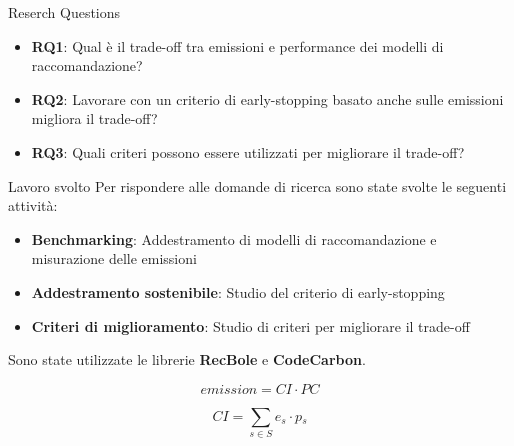 \begin{frame}{Reserch Questions}
    \begin{itemize}
        \item \textbf{RQ1}: Qual è il trade-off tra emissioni e performance dei modelli di raccomandazione?
        \item \textbf{RQ2}: Lavorare con un criterio di early-stopping basato anche sulle emissioni migliora il trade-off?
        \item \textbf{RQ3}: Quali criteri possono essere utilizzati per migliorare il trade-off?
    \end{itemize}
\end{frame}

\begin{frame}{Lavoro svolto}
    Per rispondere alle domande di ricerca sono state svolte le seguenti attività:
    \begin{itemize}
        \item \textbf{Benchmarking}: Addestramento di modelli di raccomandazione e misurazione delle emissioni
        \item \textbf{Addestramento sostenibile}: Studio del criterio di early-stopping
        \item \textbf{Criteri di miglioramento}: Studio di criteri per migliorare il trade-off
    \end{itemize}
    Sono state utilizzate le librerie \textbf{RecBole} e \textbf{CodeCarbon}.

    \begin{equation*}
        \textit{emission} = \textit{CI}  \cdot \textit{PC}
    \end{equation*}
    
    \begin{equation*}
        \textit{CI} = \sum_{s \in S} \textit{e$_s$} \cdot \textit{p$_s$}
    \end{equation*}
    
\end{frame}